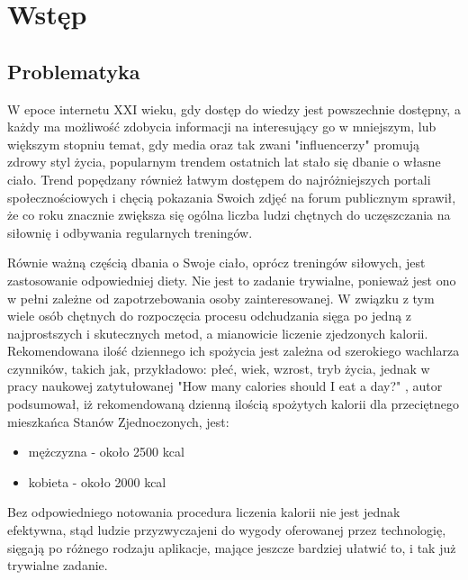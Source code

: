 \documentclass[12pt, a4paper]{article}
\begin{document}
\begin{sloppypar}


\tableofcontents
\newpage

\section{Wstęp}
{
  \subsection{Problematyka}
  {
    W epoce internetu XXI wieku, gdy dostęp do wiedzy jest powszechnie dostępny, a 
    każdy ma możliwość zdobycia informacji na interesujący go w mniejszym,
    lub większym stopniu temat, gdy media oraz tak zwani "influencerzy" promują zdrowy
    styl życia, popularnym trendem ostatnich lat stało się dbanie o własne ciało. 
    Trend popędzany również łatwym dostępem do najróżniejszych portali
    społecznościowych i chęcią pokazania Swoich zdjęć na forum publicznym sprawił, 
    że co roku znacznie zwiększa się ogólna liczba ludzi chętnych do uczęszczania na
    siłownię i odbywania regularnych treningów.

    Równie ważną częścią dbania o Swoje ciało, oprócz treningów siłowych, jest 
    zastosowanie odpowiedniej diety. Nie jest to zadanie trywialne, ponieważ jest 
    ono w pełni zależne od zapotrzebowania osoby zainteresowanej. W związku z tym
    wiele osób chętnych do rozpoczęcia procesu odchudzania sięga po jedną z
    najprostszych i skutecznych metod, a mianowicie liczenie zjedzonych kalorii.
    Rekomendowana ilość dziennego ich spożycia jest zależna od szerokiego wachlarza
    czynników, takich jak, przykładowo: płeć, wiek, wzrost, tryb życia, 
    jednak w pracy naukowej zatytułowanej "How many calories should I eat a day?"
    \cite{cal}, autor podsumował, iż rekomendowaną dzienną ilością spożytych kalorii 
    dla przeciętnego mieszkańca Stanów Zjednoczonych, jest:
    \begin{itemize}
      \item mężczyzna - około 2500 kcal
      \item kobieta - około 2000 kcal
    \end{itemize}
    Bez odpowiedniego notowania procedura liczenia kalorii nie jest jednak efektywna, 
    stąd ludzie przyzwyczajeni do wygody oferowanej przez technologię, sięgają po 
    różnego rodzaju aplikacje, mające jeszcze bardziej ułatwić to, i tak już trywialne
    zadanie.

}}
\end{sloppypar}
\end{document}

